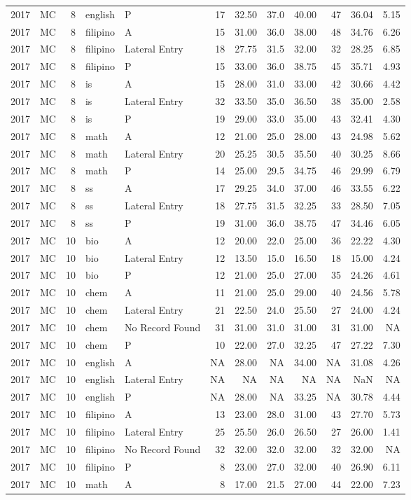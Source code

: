 \documentclass[]{article}
\begin{document}
\begin{longtable}[]{@{}rlrllrrrrrrr@{}}
2017 & MC & 8 & english & P & 17 & 32.50 & 37.0 & 40.00 & 47 & 36.04 &
5.15\tabularnewline
2017 & MC & 8 & filipino & A & 15 & 31.00 & 36.0 & 38.00 & 48 & 34.76 &
6.26\tabularnewline
2017 & MC & 8 & filipino & Lateral Entry & 18 & 27.75 & 31.5 & 32.00 &
32 & 28.25 & 6.85\tabularnewline
2017 & MC & 8 & filipino & P & 15 & 33.00 & 36.0 & 38.75 & 45 & 35.71 &
4.93\tabularnewline
2017 & MC & 8 & is & A & 15 & 28.00 & 31.0 & 33.00 & 42 & 30.66 &
4.42\tabularnewline
2017 & MC & 8 & is & Lateral Entry & 32 & 33.50 & 35.0 & 36.50 & 38 &
35.00 & 2.58\tabularnewline
2017 & MC & 8 & is & P & 19 & 29.00 & 33.0 & 35.00 & 43 & 32.41 &
4.30\tabularnewline
2017 & MC & 8 & math & A & 12 & 21.00 & 25.0 & 28.00 & 43 & 24.98 &
5.62\tabularnewline
2017 & MC & 8 & math & Lateral Entry & 20 & 25.25 & 30.5 & 35.50 & 40 &
30.25 & 8.66\tabularnewline
2017 & MC & 8 & math & P & 14 & 25.00 & 29.5 & 34.75 & 46 & 29.99 &
6.79\tabularnewline
2017 & MC & 8 & ss & A & 17 & 29.25 & 34.0 & 37.00 & 46 & 33.55 &
6.22\tabularnewline
2017 & MC & 8 & ss & Lateral Entry & 18 & 27.75 & 31.5 & 32.25 & 33 &
28.50 & 7.05\tabularnewline
2017 & MC & 8 & ss & P & 19 & 31.00 & 36.0 & 38.75 & 47 & 34.46 &
6.05\tabularnewline
2017 & MC & 10 & bio & A & 12 & 20.00 & 22.0 & 25.00 & 36 & 22.22 &
4.30\tabularnewline
2017 & MC & 10 & bio & Lateral Entry & 12 & 13.50 & 15.0 & 16.50 & 18 &
15.00 & 4.24\tabularnewline
2017 & MC & 10 & bio & P & 12 & 21.00 & 25.0 & 27.00 & 35 & 24.26 &
4.61\tabularnewline
2017 & MC & 10 & chem & A & 11 & 21.00 & 25.0 & 29.00 & 40 & 24.56 &
5.78\tabularnewline
2017 & MC & 10 & chem & Lateral Entry & 21 & 22.50 & 24.0 & 25.50 & 27 &
24.00 & 4.24\tabularnewline
2017 & MC & 10 & chem & No Record Found & 31 & 31.00 & 31.0 & 31.00 & 31
& 31.00 & NA\tabularnewline
2017 & MC & 10 & chem & P & 10 & 22.00 & 27.0 & 32.25 & 47 & 27.22 &
7.30\tabularnewline
2017 & MC & 10 & english & A & NA & 28.00 & NA & 34.00 & NA & 31.08 &
4.26\tabularnewline
2017 & MC & 10 & english & Lateral Entry & NA & NA & NA & NA & NA & NaN
& NA\tabularnewline
2017 & MC & 10 & english & P & NA & 28.00 & NA & 33.25 & NA & 30.78 &
4.44\tabularnewline
2017 & MC & 10 & filipino & A & 13 & 23.00 & 28.0 & 31.00 & 43 & 27.70 &
5.73\tabularnewline
2017 & MC & 10 & filipino & Lateral Entry & 25 & 25.50 & 26.0 & 26.50 &
27 & 26.00 & 1.41\tabularnewline
2017 & MC & 10 & filipino & No Record Found & 32 & 32.00 & 32.0 & 32.00
& 32 & 32.00 & NA\tabularnewline
2017 & MC & 10 & filipino & P & 8 & 23.00 & 27.0 & 32.00 & 40 & 26.90 &
6.11\tabularnewline
2017 & MC & 10 & math & A & 8 & 17.00 & 21.5 & 27.00 & 44 & 22.00 &
7.23\tabularnewline

\end{longtable}
\end{document}

